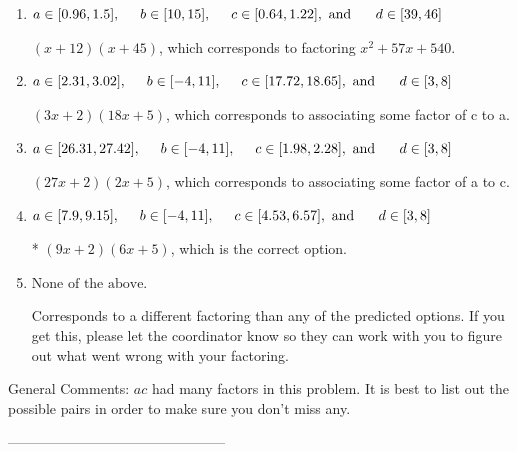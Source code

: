 \documentclass{extbook}[14pt]
\begin{document}
\begin{enumerate}[label=\Alph*.] 
\item $ a \in [0.96, 1.5], \hspace*{5mm} b \in [10, 15], \hspace*{5mm} c \in [0.64, 1.22], \text{ and } \hspace*{5mm} d \in [39, 46] $ 

  $(x + 12)(x + 45)$, which corresponds to factoring $x^{2} +57 x + 540$. 
\item $ a \in [2.31, 3.02], \hspace*{5mm} b \in [-4, 11], \hspace*{5mm} c \in [17.72, 18.65], \text{ and } \hspace*{5mm} d \in [3, 8] $ 

  $(3x + 2)(18x + 5)$, which corresponds to associating some factor of c to a. 
\item $ a \in [26.31, 27.42], \hspace*{5mm} b \in [-4, 11], \hspace*{5mm} c \in [1.98, 2.28], \text{ and } \hspace*{5mm} d \in [3, 8] $ 

  $(27x + 2)(2x + 5)$, which corresponds to associating some factor of a to c. 
\item $ a \in [7.9, 9.15], \hspace*{5mm} b \in [-4, 11], \hspace*{5mm} c \in [4.53, 6.57], \text{ and } \hspace*{5mm} d \in [3, 8] $ 

 * $(9x + 2)(6x + 5)$, which is the correct option. 
\item $ \text{None of the above.} $ 

  Corresponds to a different factoring than any of the predicted options. If you get this, please let the coordinator know so they can work with you to figure out what went wrong with your factoring. 
\end{enumerate} 
 
General Comments: $ac$ had many factors in this problem. It is best to list out the possible pairs in order to make sure you don't miss any.

-----------------------------------------------
\end{document}
